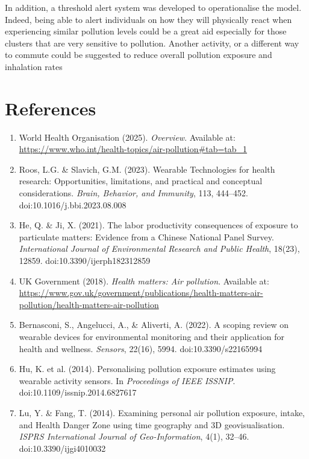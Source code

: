 \documentclass[12pt,a4paper]{report}
\begin{document}
In addition, a threshold alert system was developed to operationalise
the model. Indeed, being able to alert individuals on how they will
physically react when experiencing similar pollution levels could be a
great aid especially for those clusters that are very sensitive to
pollution. Another activity, or a different way to commute could be
suggested to reduce overall pollution exposure and inhalation rates
\chapter*{References}
\begin{enumerate}

\item World Health Organisation (2025). \emph{Overview}. Available at: \url{https://www.who.int/health-topics/air-pollution#tab=tab_1}

\item Roos, L.G. \& Slavich, G.M. (2023). Wearable Technologies for health research: Opportunities, limitations, and practical and conceptual considerations. \emph{Brain, Behavior, and Immunity}, 113, 444--452. doi:10.1016/j.bbi.2023.08.008

\item He, Q. \& Ji, X. (2021). The labor productivity consequences of exposure to particulate matters: Evidence from a Chinese National Panel Survey. \emph{International Journal of Environmental Research and Public Health}, 18(23), 12859. doi:10.3390/ijerph182312859

\item UK Government (2018). \emph{Health matters: Air pollution}. Available at: \url{https://www.gov.uk/government/publications/health-matters-air-pollution/health-matters-air-pollution}

\item Bernasconi, S., Angelucci, A., \& Aliverti, A. (2022). A scoping review on wearable devices for environmental monitoring and their application for health and wellness. \emph{Sensors}, 22(16), 5994. doi:10.3390/s22165994

\item Hu, K. et al. (2014). Personalising pollution exposure estimates using wearable activity sensors. In \emph{Proceedings of IEEE ISSNIP}. doi:10.1109/issnip.2014.6827617

\item Lu, Y. \& Fang, T. (2014). Examining personal air pollution exposure, intake, and Health Danger Zone using time geography and 3D geovisualisation. \emph{ISPRS International Journal of Geo-Information}, 4(1), 32--46. doi:10.3390/ijgi4010032


\end{enumerate}
\end{document}
